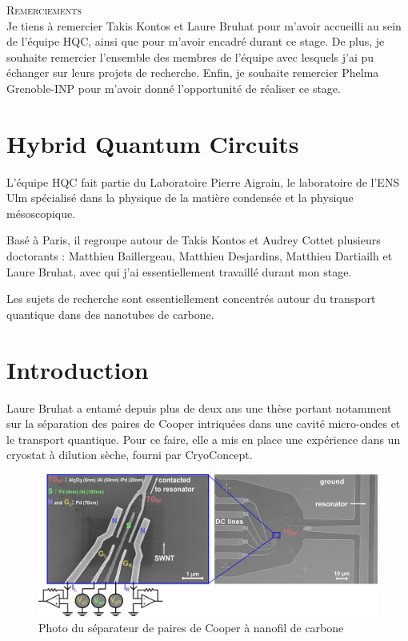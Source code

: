 \documentclass[a4paper,11pt]{report}
\date{}
\title{}
\author{}
\begin{document}
\nocite{*}


\begin{center}
\textsc{\Large Remerciements}
\\
\vspace{0.5cm}
Je tiens à remercier Takis Kontos et Laure Bruhat pour m'avoir accueilli au sein de l'équipe HQC, ainsi que pour m'avoir encadré durant ce stage. De plus, je souhaite remercier l'ensemble des membres de l'équipe avec lesquels j'ai pu échanger sur leurs projets de recherche. Enfin, je souhaite remercier Phelma Grenoble-INP pour m'avoir donné l'opportunité de réaliser ce stage.
\end{center}

\chapter*{Hybrid Quantum Circuits}
L'équipe HQC fait partie du Laboratoire Pierre Aigrain, le laboratoire de l'ENS Ulm spécialisé dans la physique de la matière condensée et la physique mésoscopique.

Basé à Paris, il regroupe autour de Takis Kontos et Audrey Cottet plusieurs doctorants : Matthieu Baillergeau, Matthieu Desjardins, Matthieu Dartiailh et Laure Bruhat, avec qui j'ai essentiellement travaillé durant mon stage.

Les sujets de recherche sont essentiellement concentrés autour du transport quantique dans des nanotubes de carbone.

\chapter*{Introduction} %

Laure Bruhat a entamé depuis plus de deux ans une thèse portant notamment sur la séparation des paires de Cooper intriquées dans une cavité micro-ondes et le transport quantique. Pour ce faire, elle a mis en place une expérience dans un cryostat à dilution sèche, fourni par CryoConcept.
\newline
\begin{figure}[h]
    \begin{center}
        \includegraphics[width=\textwidth]{Images/Expe_photo.jpg}
        \caption*{Photo du séparateur de paires de Cooper à nanofil de carbone}
        \label{fig:}
    \end{center}
\end{figure}
\end{document}
